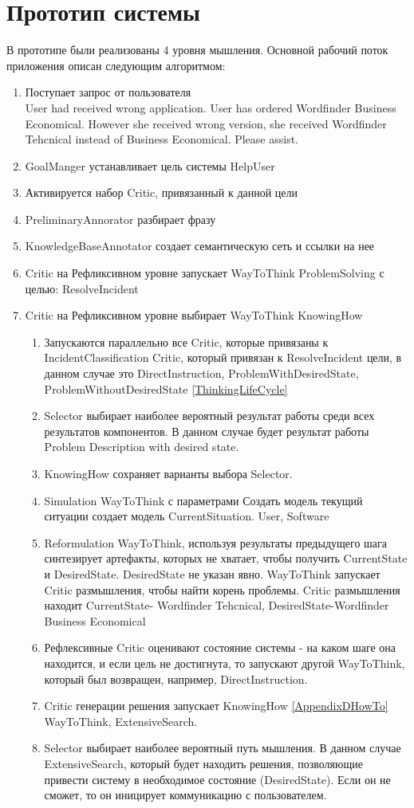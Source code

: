 \section{Прототип системы}
В прототипе были реализованы 4 уровня мышления. Основной рабочий поток приложения описан следующим алгоритмом:
\begin{enumerate}
	\item Поступает запрос от пользователя \\
	User had received wrong application.
User has ordered Wordfinder Business Economical.
However she received wrong version, she received Wordfinder Tehcnical instead of Business Economical. Please assist.
	\item GoalManger устанавливает цель системы HelpUser
	\item Активируется набор Critic, привязанный к данной цели
	\item PreliminaryAnnorator разбирает фразу
	\item KnowledgeBaseAnnotator создает семантическую сеть и ссылки на нее
	\item Critic на Рефликсивном уровне запускает WayToThink ProblemSolving с целью: ResolveIncident
	\item Critic на Рефликсивном уровне выбирает WayToThink KnowingHow
	\begin{enumerate}
	\item Запускаются параллельно все Critic, которые привязаны к IncidentClassification Critic, который привязан к ResolveIncident цели, в данном случае это DirectInstruction, ProblemWithDesiredState, ProblemWithoutDesiredState \ref{ThinkingLifeCycle}
	\item Selector выбирает наиболее вероятный результат работы среди всех результатов компонентов. В данном случае будет результат работы Problem Description with desired state.
	\item KnowingHow сохраняет варианты выбора Selector.
	\item Simulation WayToThink с параметрами Создать модель текущий ситуации создает модель CurrentSituation. User, Software
	\item Reformulation WayToThink, используя результаты предыдущего шага синтезирует артефакты, которых не хватает, чтобы получить CurrentState и DesiredState. DesiredState не указан явно. WayToThink запускает Critic размышления, чтобы найти корень проблемы. Critic размышления находит CurrentState- Wordfinder Tehcnical, DesiredState-Wordfinder Business Economical
	\item Рефлексивные Critic оценивают состояние системы - на каком шаге она находится, и если цель не достигнута, то запускают другой WayToThink, который был возвращен, например, DirectInstruction. 
	\item Critic генерации решения запускает KnowingHow \ref{AppendixDHowTo} WayToThink, ExtensiveSearch.
	\item Selector выбирает наиболее вероятный путь мышления. В данном случае ExtensiveSearch, который будет находить решения, позволяющие привести систему в необходимое состояние (DesiredState). Если он не сможет, то он иницирует коммуникацию с пользователем. 
	


\end{enumerate}
\end{enumerate}
